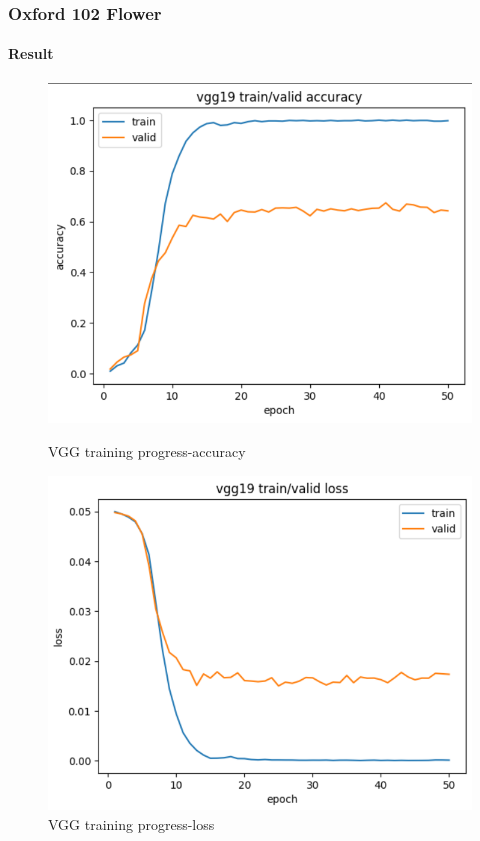 \documentclass[
	11pt, %
	aspectratio=169, %
]{beamer}
\begin{document}
\begin{frame}
	\frametitle{Oxford 102 Flower}
	\framesubtitle{Result}

	\begin{figure}[htbp]
		\begin{minipage}[t]{0.48\textwidth}
			\includegraphics[width=1.0\linewidth]{vgg_accuracy.png}
			\caption{VGG training progress-accuracy}
		\end{minipage}
		\begin{minipage}[t]{0.48\textwidth}
			\includegraphics[width=1.0\linewidth]{vgg_loss.png}
			\caption{VGG training progress-loss}
		\end{minipage}
	\end{figure}

\end{frame}
\end{document}

